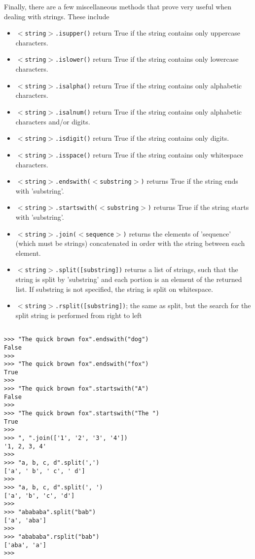 Finally, there are a few miscellaneous methods that prove very   useful when dealing with strings. These include
\begin{itemize}
	\item 
\texttt{$<$string$>$.isupper()} return True if the string    contains only uppercase characters.
	\item 
\texttt{$<$string$>$.islower()} return True if the string    contains only lowercase characters.
	\item 
\texttt{$<$string$>$.isalpha()} return True if the string    contains only alphabetic characters.
	\item 
\texttt{$<$string$>$.isalnum()} return True if the string    contains only alphabetic characters and/or digits.
	\item 
\texttt{$<$string$>$.isdigit()} return True if the string    contains only digits.
	\item 
\texttt{$<$string$>$.isspace()} return True if the string    contains only whitespace characters.
	\item 
\texttt{$<$string$>$.endswith($<$substring$>$)} returns    True if the string ends with 'substring'.
	\item 
\texttt{$<$string$>$.startswith($<$substring$>$)}    returns True if the string starts with 'substring'.
	\item 
\texttt{$<$string$>$.join($<$sequence$>$)} returns the    elements of 'sequence' (which must be strings) concatenated in    order with the string between each element.
	\item 
\texttt{$<$string$>$.split([substring])} returns a list    of strings, such that the string is split by 'substring' and each    portion is an element of the returned list. If substring is not    specified, the string is split on whitespace.
	\item 
\texttt{$<$string$>$.rsplit([substring])}; the same as    split, but the search for the split string is performed from right    to left
\end{itemize}
\begin{lstlisting}

>>> "The quick brown fox".endswith("dog")
False
>>>
>>> "The quick brown fox".endswith("fox")
True
>>>
>>> "The quick brown fox".startswith("A")
False
>>>
>>> "The quick brown fox".startswith("The ")
True
>>>
>>> ", ".join(['1', '2', '3', '4'])
'1, 2, 3, 4'
>>> 
>>> "a, b, c, d".split(',')
['a', ' b', ' c', ' d']
>>>
>>> "a, b, c, d".split(', ')
['a', 'b', 'c', 'd']
>>> 
>>> "abababa".split("bab")
['a', 'aba']
>>>
>>> "abababa".rsplit("bab")
['aba', 'a']
>>>
\end{lstlisting}


